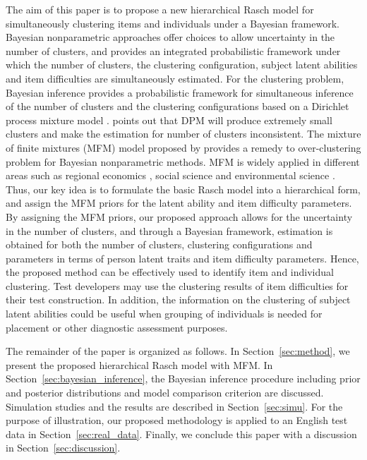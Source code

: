 \documentclass[12pt]{article}
\begin{document}
The aim of this paper is to propose a new hierarchical Rasch model for simultaneously clustering items and individuals under a Bayesian framework. Bayesian nonparametric approaches offer choices to allow uncertainty in the number of clusters, and provides an integrated probabilistic framework under which the number of clusters, the clustering configuration, subject latent abilities and item difficulties are simultaneously estimated.
For the clustering problem, Bayesian
inference provides a probabilistic framework for simultaneous inference of the
number of clusters and the clustering configurations based on a Dirichlet process
mixture model \citep[DPM;][]{ferguson1973bayesian}. \cite{miller2013simple}
points out that DPM will produce extremely small clusters and make the
estimation for number of clusters inconsistent. The mixture of finite mixtures (MFM)
model proposed by \cite{miller2018mixture} provides a remedy to over-clustering problem for Bayesian nonparametric methods. MFM is widely applied in different areas such as regional economics \citep{hu2020bayesian}, social science \citep{geng2019probabilistic} and environmental science \citep{geng2019bayesian}.
Thus, our key idea is to formulate the basic Rasch model into a hierarchical form, and assign the MFM priors for the latent ability and item difficulty parameters. 
By assigning the MFM priors, our proposed approach allows for the uncertainty in the number of clusters, and through a Bayesian framework,  estimation is obtained for both the number of clusters, clustering configurations and parameters in terms of person latent traits and item difficulty parameters. Hence, the proposed method can be effectively used to identify item and individual clustering. Test developers may use the clustering results of item difficulties for their test construction. In addition, the information on the clustering of subject latent abilities could be useful when grouping of individuals is needed for placement or other diagnostic assessment purposes. 


The remainder of the paper is organized as follows. In
Section~\ref{sec:method},
we present the proposed hierarchical Rasch model with MFM. In
Section~\ref{sec:bayesian_inference}, the Bayesian inference procedure including prior and posterior distributions and model comparison criterion are discussed. Simulation studies and the results are described 
in
Section~\ref{sec:simu}. For the purpose of illustration, our proposed methodology is applied
to
an English test data in Section~\ref{sec:real_data}. Finally, we conclude this
paper with a discussion in Section~\ref{sec:discussion}.
\end{document}

